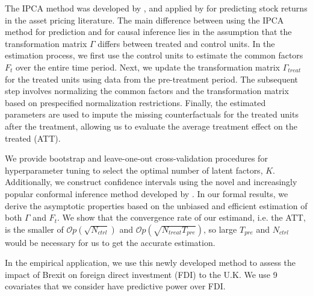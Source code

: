 \documentclass[12pt]{article}
\begin{document}
The IPCA method was developed by \cite{kelly2020instrumented}, and applied by \cite{kelly2019characteristics} for predicting stock returns in the asset pricing literature. The main difference between using the IPCA method for prediction and for causal inference lies in the assumption that the transformation matrix $\Gamma$ differs between treated and control units. In the estimation process, we first use the control units to estimate the common factors $F_t$ over the entire time period. Next, we update the transformation matrix $\Gamma_{treat}$ for the treated units using data from the pre-treatment period. The subsequent step involves normalizing the common factors and the transformation matrix based on prespecified normalization restrictions. Finally, the estimated parameters are used to impute the missing counterfactuals for the treated units after the treatment, allowing us to evaluate the average treatment effect on the treated (ATT).

We provide bootstrap and leave-one-out cross-validation procedures for hyperparameter tuning to select the optimal number of latent factors, $K$. Additionally, we construct confidence intervals using the novel and increasingly popular conformal inference method developed by \cite{chernozhukov2021exact}. In our formal results, we derive the asymptotic properties based on the unbiased and efficient estimation of both $\Gamma$ and $F_t$. We show that the convergence rate of our estimand, i.e. the ATT, is the smaller of $\mathcal{O}p(\sqrt{N_{ctrl}})$ and $\mathcal{O}p(\sqrt{N_{treat}T_{pre}})$, so large $T_{pre}$ and $N_{ctrl}$ would be necessary for us to get the accurate estimation.

In the empirical application, we use this newly developed method to assess the impact of Brexit on foreign direct investment (FDI) to the U.K. We use 9 covariates that we consider have predictive power over FDI. 

\end{document}
